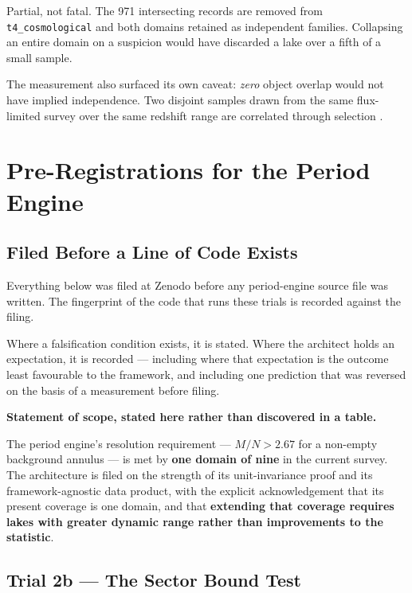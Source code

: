 \documentclass[11pt, letterpaper, openany]{book}
\begin{document}
Partial, not fatal. The 971 intersecting records are removed from \texttt{t4\_cosmological} and
both domains retained as independent families. Collapsing an entire domain on a suspicion would
have discarded a lake over a fifth of a small sample.

The measurement also surfaced its own caveat: \emph{zero} object overlap would not have implied
independence. Two disjoint samples drawn from the same flux-limited survey over the same
redshift range are correlated through selection \cite{malmquist1922}.

\chapter{Pre-Registrations for the Period Engine}

\section{Filed Before a Line of Code Exists}

Everything below was filed at Zenodo before any period-engine source file was written. The
fingerprint of the code that runs these trials is recorded against the filing.

Where a falsification condition exists, it is stated. Where the architect holds an expectation,
it is recorded --- including where that expectation is the outcome least favourable to the
framework, and including one prediction that was reversed on the basis of a measurement before
filing.

\begin{predictionbox}
\textbf{Statement of scope, stated here rather than discovered in a table.}

The period engine's resolution requirement --- $M/N > 2.67$ for a non-empty background annulus
--- is met by \textbf{one domain of nine} in the current survey. The architecture is filed on
the strength of its unit-invariance proof and its framework-agnostic data product, with the
explicit acknowledgement that its present coverage is one domain, and that \textbf{extending
that coverage requires lakes with greater dynamic range rather than improvements to the
statistic}.
\end{predictionbox}

\section{Trial 2b --- The Sector Bound Test}
\end{document}
